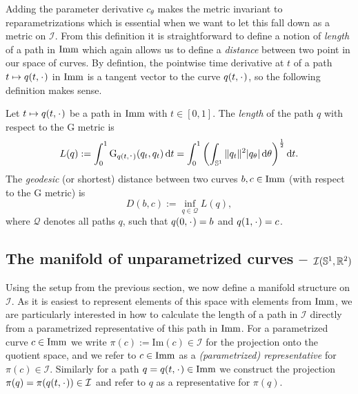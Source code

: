 Adding the parameter derivative $c_{\theta}$ makes the metric invariant to reparametrizations which is essential when we want to let this fall down as a metric on $\mathcal{I}$. From this definition it is straightforward to define a notion of \textit{length} of a path in $\mathop{}\!\mathrm{Imm}$ which again allows us to define a \textit{distance} between two point in our space of curves. By defintion, the pointwise time derivative at $t$ of a path $t \mapsto q(t, \blank)$ in $\mathop{}\!\mathrm{Imm}$ is a tangent vector to the curve $q(t,\blank)$, so the following definition makes sense.

\begin{definition}
  \label{def:length-in-imm}
  Let $t \mapsto q(t,\blank)$ be a path in $\mathop{}\!\mathrm{Imm}$ with $t \in [0,1]$. The \textit{length} of the path $q$ with respect to the $\mathrm{G}$ metric  is
  \begin{equation*}
    L(q) := \int_{0}^{1} \mathrm{G}_{q(t,\blank)}(q_t,q_t) \diff t =
    \int_{0}^{1}
    \left(
      \int_{\S^{1}} \|q_t\|^2 |q_{\theta}| \diff \theta
    \right)^{\frac{1}{2}}
    \diff t.
  \end{equation*}
  The \textit{geodesic} (or shortest) distance between two curves $b,c \in \mathop{}\!\mathrm{Imm}$ (with respect to the $\mathrm{G}$ metric) is
  \begin{equation*}
    D(b,c) := \inf_{q \in \mathcal{Q}} L(q),
  \end{equation*}
  where $\mathcal{Q}$ denotes all paths $q$, such that $q(0,\blank)=b$ and $q(1,\blank)=c$.
\end{definition}


\subsection{The manifold of unparametrized curves -- $\mathcal{I}(\mathbb{S}^1, \mathbb{R}^2)$}
\label{sec:manif-unpar-curv}

Using the setup from the previous section, we now define a manifold structure on $\mathcal{I}$. As it is easiest to represent elements of this space with elements from $\mathop{}\!\mathrm{Imm}$, we are particularly interested in how to calculate the length of a path in $\mathcal{I}$ directly from a parametrized representative of this path in $\mathop{}\!\mathrm{Imm}$. For a parametrized curve $c \in \mathop{}\!\mathrm{Imm}$ we write $\pi(c) := \mathrm{Im}(c)\in \mathcal{I}$ for the projection onto the quotient space, and we refer to $c\in\mathop{}\!\mathrm{Imm}$ as a \textit{(parametrized) representative} for $\pi(c) \in \mathcal{I}$. Similarly for a path $q = q(t, \blank) \in \I$ we construct the projection $\pi(q) = \pi(q(t,\blank)) \in \mathcal{I}$ and refer to $q$ as a representative for $\pi(q)$.

